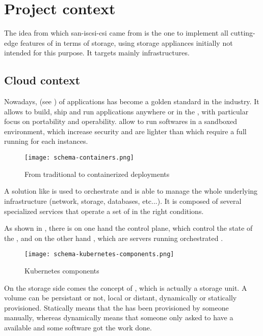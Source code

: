 \section{Project context}

The idea from which \gls{san-iscsi-csi} came from is the one to implement all cutting-edge features of  in terms of storage, using storage appliances initially not intended for this purpose. It targets mainly   infrastructures.

\subsection{Cloud context}

Nowadays,  (see ) of applications has become a golden standard in the industry. It allows to build, ship and run applications anywhere  or in the , with particular focus on portability and operability.  allow to run softwares in a sandboxed environment, which increase security and are lighter than  which require a full  running for each instances.

\begin{figure}[h]
    \centering
    \texttt{[image: schema-containers.png]}
    \caption{From traditional to containerized deployments}
    \label{fig:containers}
\end{figure}

A solution like  is used to orchestrate  and is able to manage the whole underlying infrastructure (network, storage, databases, etc...). It is composed of several specialized services that operate a set of  in the right conditions.

As shown in , there is on one hand the control plane, which control the state of the , and on the other hand  , which are servers running orchestrated .

\begin{figure}[h]
    \centering
    \texttt{[image: schema-kubernetes-components.png]}
    \caption{Kubernetes components}
    \label{fig:k8s-components}
\end{figure}

On the storage side comes the concept of , which is actually a storage unit. A volume can be persistant or not, local or distant, dynamically or statically provisioned. Statically means that the  has been provisioned by someone manually, whereas dynamically means that someone only asked to have a  available and some software got the work done.

